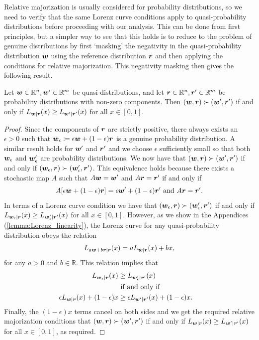 \documentclass[pra,
aps,
twocolumn,
superscriptaddress,
groupedaddress,
nofootinbib,
reprint
]{revtex4-1}
\begin{document}
Relative majorization is usually considered for probability distributions, so we need to verify that the same Lorenz curve conditions apply to quasi-probability distributions before proceeding with our analysis. This can be done from first principles, but a simpler way to see that this holds is to reduce to the problem of genuine distributions by first `masking' the negativity in the quasi-probability distribution $\boldsymbol{w}$ using the reference distribution $\boldsymbol{r}$ and then applying the conditions for relative majorization. This negativity masking then gives the following result.

\begin{theorem}\label{thm:lcquasi}
	Let $\boldsymbol{w} \in \mathbb{R}^n,\boldsymbol{w}'\in \mathbb{R}^m$ be quasi-distributions, and let $\boldsymbol{r} \in \mathbb{R}^n, \boldsymbol{r}' \in \mathbb{R}^m$ be probability distributions with non-zero components. Then $(\boldsymbol{w}, \boldsymbol{r}) \succ (\boldsymbol{w}', \boldsymbol{r}')$ if and only if $L_{\boldsymbol{w}|\boldsymbol{r}}(x) \ge L_{\boldsymbol{w}' |\boldsymbol{r}'}(x)$ for all $x \in [0,1]$.
\end{theorem}
\begin{proof}
	Since the components of $\boldsymbol{r}$ are strictly positive, there always exists an $\epsilon >0$ such that $\boldsymbol{w}_\epsilon \coloneqq \epsilon \boldsymbol{w} + (1-\epsilon) \boldsymbol{r}$ is a genuine probability distribution. A similar result holds for $\boldsymbol{w}'$ and $\boldsymbol{r}'$ and we choose $\epsilon$ sufficiently small so that both $\boldsymbol{w}_\epsilon$ and $\boldsymbol{w}_\epsilon'$ are probability distributions. We now have that $(\boldsymbol{w} , \boldsymbol{r}) \succ (\boldsymbol{w}', \boldsymbol{r}')$ if and only if $(\boldsymbol{w}_\epsilon , \boldsymbol{r}) \succ (\boldsymbol{w}_\epsilon', \boldsymbol{r}')$. This equivalence holds because there exists a stochastic map $A$ such that $A \boldsymbol{w} = \boldsymbol{w}'$ and $A \boldsymbol{r} = \boldsymbol{r}'$ if and only if 
\begin{equation}
A[\epsilon \boldsymbol{w} + (1-\epsilon) \boldsymbol{r}] = \epsilon \boldsymbol{w}' + (1-\epsilon) \boldsymbol{r}'\mbox{ and } A\boldsymbol{r} = \boldsymbol{r}'.
\end{equation}
In terms of a Lorenz curve condition we have that $(\boldsymbol{w}_\epsilon , \boldsymbol{r}) \succ (\boldsymbol{w}_\epsilon', \boldsymbol{r}')$ if and only if $L_{\boldsymbol{w}_\epsilon |\boldsymbol{r}} (x) \ge L_{\boldsymbol{w}'_\epsilon |\boldsymbol{r}'} (x)$ for all $x \in [0,1]$. 
However, as we show in the Appendices (\cref{lemma:Lorenz_linearity}), the Lorenz curve for any quasi-probability distribution obeys the relation
\begin{equation}
L_{a \boldsymbol{w} + b \boldsymbol{r} | \boldsymbol{r}} (x) = a L_{\boldsymbol{w}|\boldsymbol{r}} (x) + bx,
\end{equation}
for any $a >0$ and $b \in \mathbb{R}$. This relation implies that
\begin{align}
L_{\boldsymbol{w}_\epsilon |\boldsymbol{r}} (x) &\ge L_{\boldsymbol{w}'_\epsilon |\boldsymbol{r}'} (x) \nonumber \\ 
&\mbox{ if and only if }& \nonumber \\
\epsilon L_{\boldsymbol{w} |\boldsymbol{r}} (x) + (1-\epsilon) x &\ge \epsilon L_{\boldsymbol{w}' |\boldsymbol{r}'} (x) + (1-\epsilon) x.
\end{align}
Finally, the $(1-\epsilon)x$ terms cancel on both sides and we get the required relative majorization conditions that $(\boldsymbol{w}, \boldsymbol{r}) \succ (\boldsymbol{w}', \boldsymbol{r}')$ if and only if $L_{\boldsymbol{w} | \boldsymbol{r}} (x) \ge L_{\boldsymbol{w}' | \boldsymbol{r}'}(x)$ for all $x \in [0,1]$, as required.
\end{proof}
\end{document}
